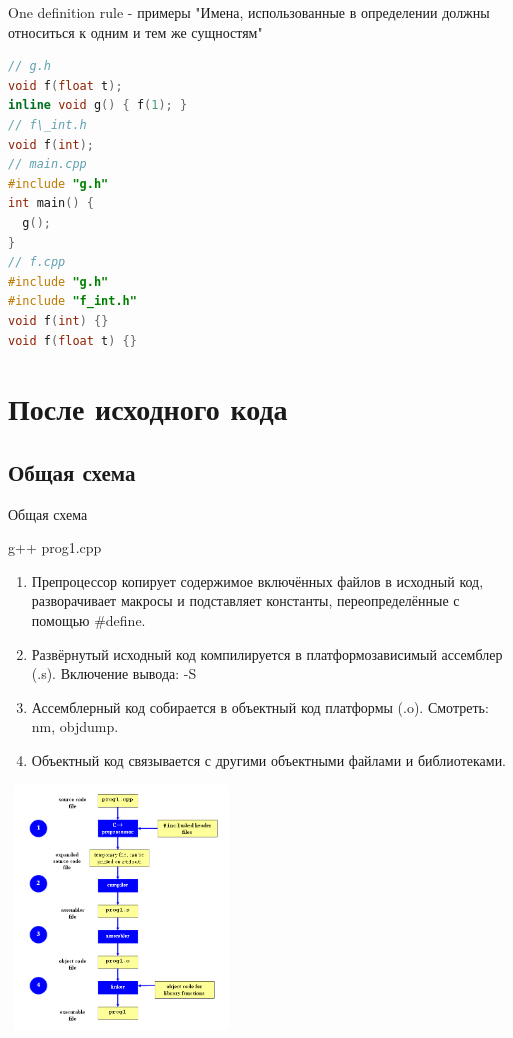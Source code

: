 \documentclass[10pt]{beamer}
\begin{document}
\begin{frame}[fragile]{One definition rule - примеры}
"Имена, использованные в определении должны относиться к одним и тем же сущностям"
\begin{lstlisting}[language=C++]
// g.h                        
void f(float t);
inline void g() { f(1); }       
// f\_int.h
void f(int);
// main.cpp
#include "g.h"
int main() {
  g(); 
}
// f.cpp
#include "g.h"
#include "f_int.h"
void f(int) {}
void f(float t) {}
\end{lstlisting}
\end{frame}

\section{После исходного кода}
\subsection{Общая схема}
\begin{frame}[fragile]{Общая схема}

\begin{multicols}{2}
g++ prog1.cpp
\begin{enumerate}
\item Препроцессор копирует содержимое включённых файлов в исходный код, разворачивает макросы и подставляет константы, переопределённые с помощью \#define.
\item Развёрнутый исходный код компилируется в платформозависимый ассемблер (.s). Включение вывода: -S
\item Ассемблерный код собирается в объектный код платформы (.o). Смотреть: nm, objdump.
\item Объектный код связывается с другими объектными файлами и библиотеками.
\end{enumerate}
\vfill\eject
 \includegraphics[width=6cm, height=6.5cm]{Term_3/Source/Pictures/compile.png}
\end{multicols}
\end{frame}
\end{document}
